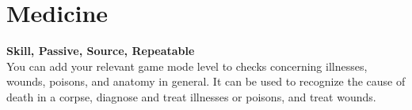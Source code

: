 \section{Medicine}\label{sec:medicine}
\textbf{Skill, Passive, Source, Repeatable}\\
You can add your relevant game mode level to checks concerning illnesses, wounds, poisons, and anatomy in general.
It can be used to recognize the cause of death in a corpse, diagnose and treat illnesses or poisons, and treat wounds.